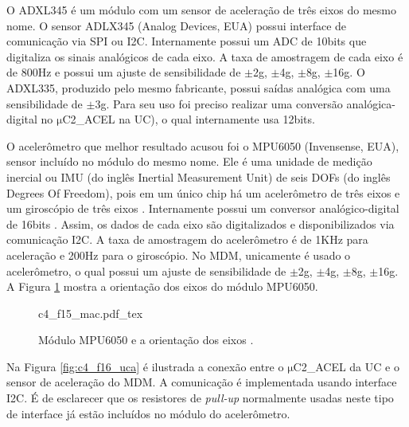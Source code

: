 O ADXL345 é um módulo com um sensor de aceleração de três eixos do mesmo nome. O sensor ADLX345 (Analog Devices, EUA) possui interface de comunicação via \acrshort{SPI} ou \acrshort{I2C}. Internamente possui um \acrshort{ADC} de 10bits que digitaliza os sinais analógicos de cada eixo. A taxa de amostragem de cada eixo é de 800Hz e possui um ajuste de sensibilidade de $\mathrm{\pm}$2g, $\mathrm{\pm}$4g, $\mathrm{\pm}$8g, $\mathrm{\pm}$16g. O ADXL335, produzido pelo mesmo fabricante, possui saídas analógica com uma sensibilidade de $\mathrm{\pm}$3g. Para seu uso foi preciso realizar uma conversão analógica-digital no $\mathrm{\mu}$C2\_ACEL na \acrshort{UC}), o qual internamente usa 12bits.

O acelerômetro que melhor resultado acusou foi o MPU6050 (Invensense, EUA), sensor incluído no módulo do mesmo nome. Ele é uma unidade de medição inercial ou \acrshort{IMU} (do inglês Inertial Measurement Unit) de seis \acrshort{DOF}s (do inglês Degrees Of Freedom), pois em um único chip há um acelerômetro de três eixos e um giroscópio de três eixos \cite{InvenSense2013MPU-6000Specification}. Internamente possui um conversor analógico-digital de 16bits \cite{InvenSense2013MPU-6000Specification}. Assim, os dados de cada eixo são digitalizados e disponibilizados via comunicação \acrshort{I2C}. A taxa de amostragem do acelerômetro é de 1KHz para aceleração e 200Hz para o giroscópio. No \acrshort{MDM}, unicamente é usado o acelerômetro, o qual possui um ajuste de sensibilidade de $\mathrm{\pm}$2g, $\mathrm{\pm}$4g, $\mathrm{\pm}$8g, $\mathrm{\pm}$16g. A Figura \ref{fig:c4_f15_mac} mostra a orientação dos eixos do módulo MPU6050.


\begin{figure}
    \centering %
    \small %
    \def\svgwidth{0.5\columnwidth}%
    {c4_f15_mac.pdf_tex}
    \caption{Módulo MPU6050 e a orientação dos eixos \cite{Naylamp2016TutorialGiroscopio}.}
    \label{fig:c4_f15_mac}
\end{figure}

Na Figura \ref{fig:c4_f16_uca} é ilustrada a conexão entre o $\mathrm{\mu}$C2\_ACEL da \acrshort{UC} e o sensor de aceleração do \acrshort{MDM}. A comunicação é implementada usando interface \acrshort{I2C}. É de esclarecer que os resistores de \textit{pull-up} normalmente usadas neste tipo de interface já estão incluídos no módulo do acelerômetro.

